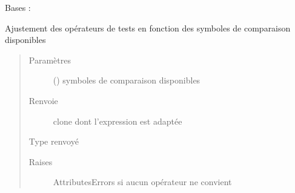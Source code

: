 \documentclass[letterpaper,10pt,french]{sphinxmanual}
\begin{document}
\begin{fulllineitems}
\label{\detokenize{comparaisonexpressionnodes:comparaisonexpressionnodes.ComparaisonExpressionNode}}
Bases : 

\begin{fulllineitems}
\label{\detokenize{comparaisonexpressionnodes:comparaisonexpressionnodes.ComparaisonExpressionNode.adjustConditionClone}}
Ajustement des opérateurs de tests en fonction des symboles de comparaison disponibles
\begin{quote}\begin{description}
\item[{Paramètres}] \leavevmode
{} (\sphinxstyleliteralemphasis{\sphinxupquote{{[}}}\sphinxstyleliteralemphasis{\sphinxupquote{{]}}}) \textendash{} symboles de comparaison disponibles

\item[{Renvoie}] \leavevmode
clone dont l’expression est adaptée

\item[{Type renvoyé}] \leavevmode
{\hyperref[\detokenize{comparaisonexpressionnodes:comparaisonexpressionnodes.ComparaisonExpressionNode}]{}}

\item[{Raises}] \leavevmode
AttributesErrors si aucun opérateur ne convient


\end{description}
\end{quote}
\end{fulllineitems}
\end{fulllineitems}
\end{document}
